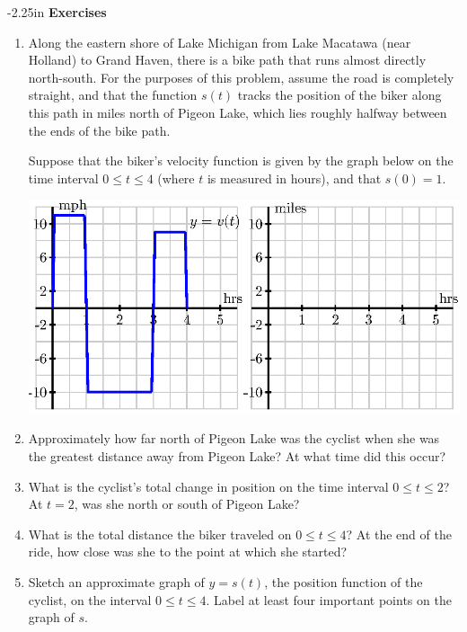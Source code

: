 \begin{adjustwidth*}{}{-2.25in}
\textbf{{\large Exercises}}
\setlength{\columnsep}{25pt}
\begin{multicols*}{2}

 \small

\begin{enumerate}[1)]
\item Along the eastern shore of Lake Michigan from Lake Macatawa (near Holland) to Grand Haven, there is a bike path that runs almost directly north-south.  For the purposes of this problem, assume the road is completely straight, and that the function $s(t)$ tracks the position of the biker along this path in miles north of Pigeon Lake, which lies roughly halfway between the ends of the bike path.  
  
Suppose that the biker's velocity function is given by the graph below on the time interval $0 \le t \le 4$ (where $t$ is measured in hours), and that $s(0) = 1$.
\begin{center}
\includegraphics[scale=.6]{figures/4_1_Ez1.eps}
\end{center}
\ba
	\item Approximately how far north of Pigeon Lake was the cyclist when she was the greatest distance away from Pigeon Lake?  At what time did this occur?
	\item What is the cyclist's total change in position on the time interval $0 \le t \le 2$?  At $t = 2$, was she north or south of Pigeon Lake?
	\item What is the total distance the biker traveled on $0 \le t \le 4$?  At the end of the ride, how close was she to the point at which she started?
	\item Sketch an approximate graph of $y = s(t)$, the position function of the cyclist, on the interval $0 \le t \le 4$.  Label at least four important points on the graph of $s$.
\ea


\end{enumerate}
\end{multicols*}
\end{adjustwidth*}
